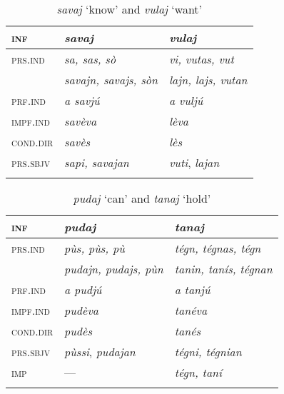 \begin{table}
	\caption{\textit{savaj} `know' and \textit{vulaj} `want'}

	\begin{tabular}{lll}
		\lsptoprule
		\textsc{inf} & \textbf{\textit{savaj}} & \textbf{\textit{vulaj}} \\
		\midrule
		\textsc{prs.ind} & \textit{sa, sas, sò} & \textit{vi, vutas, vut} \\
		& \textit{savajn, savajs, sòn} & \textit{lajn, lajs, vutan} \\
		\textsc{prf.ind} & \textit{a savjú} & \textit{a vuljú}\\
		\textsc{impf.ind} & \textit{savèva} & \textit{lèva}\\
		\textsc{cond.dir} & \textit{savès} & \textit{lès}\\
		\textsc{prs.sbjv} & \textit{sapi, savajan} & \textit{vuti}, \textit{lajan}\\
		\lspbottomrule
	\end{tabular}
\end{table}


\begin{table}
	\caption{\textit{pudaj} `can' and \textit{tanaj} `hold'}

	\begin{tabular}{lll}
		\lsptoprule
		\textsc{inf} & \textit{\textbf{pudaj}} & \textbf{\textit{tanaj}}\\
		\midrule
		\textsc{prs.ind} & \textit{pùs, pùs, pù} & \textit{tégn, tégnas, tégn}\\
		& \textit{pudajn, pudajs, pùn} & \textit{tanin, tanís, tégnan}\\
		\textsc{prf.ind} & \textit{a pudjú} & \textit{a tanjú}\\
		\textsc{impf.ind} & \textit{pudèva} & \textit{tanéva}\\
		\textsc{cond.dir} & \textit{pudès} & \textit{tanés}\\
		\textsc{prs.sbjv} & \textit{pùssi}, \textit{pudajan} & \textit{tégni, tégnian}\\
		\textsc{imp} & --- & \textit{tégn, taní}\\\lspbottomrule
	\end{tabular}
\end{table}


